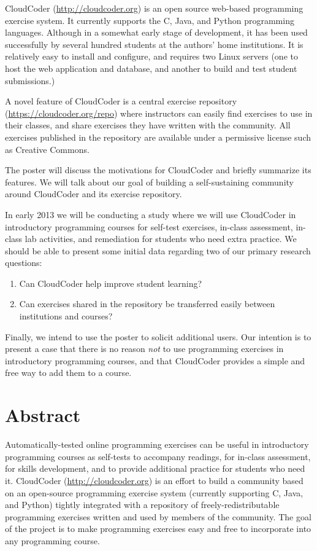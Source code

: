 \documentclass[11pt]{article}
\newcommand{\BE}{\begin{enumerate}[itemsep=.05in,parsep=0in]}
\newcommand{\EE}{\end{enumerate}}
\begin{document}
CloudCoder (\url{http://cloudcoder.org}) is an open source web-based
programming exercise system.  It currently supports the C, Java, and
Python programming languages.  Although in a somewhat early stage of
development, it has been used successfully by several hundred students
at the authors' home institutions.  It is relatively easy to
install and configure, and requires two Linux servers
(one to host the web application and database, and another to build
and test student submissions.)

A novel feature of CloudCoder is a central exercise repository
(\url{https://cloudcoder.org/repo}) where
instructors can easily find exercises to use in their classes,
and share exercises they have written with the community.  All exercises
published in the repository are available under a permissive license
such as Creative Commons.

The poster will discuss the motivations for CloudCoder and briefly summarize
its features.  We will talk about our goal of building a self-sustaining
community around CloudCoder and its exercise repository.

In early 2013 we will be conducting a study where we will use CloudCoder
in introductory programming courses for self-test exercises, in-class
assessment, in-class lab activities, and remediation for students who need
extra practice.  We should be able to present some initial data regarding
two of our primary research questions:

\BE
\item Can CloudCoder help improve student learning?
\item Can exercises shared in the repository be transferred
      easily between institutions and courses?
\EE

Finally, we intend to use the poster to solicit additional users.
Our intention is to present a case that there is no reason {\em not}
to use programming exercises in introductory programming courses,
and that CloudCoder provides a simple and free way to add them
to a course.

\section*{Abstract}

Automatically-tested online programming exercises can be useful in
introductory programming courses as self-tests to accompany readings,
for in-class assessment, for skills development, and to provide
additional practice for students who need it.  CloudCoder (\url{http://cloudcoder.org}) is
an effort to build a community based on an open-source programming exercise
system (currently supporting C, Java, and Python) tightly integrated
with a repository of freely-redistributable
programming exercises written and used by members of the community.
The goal of the project is to make programming exercises easy and free
to incorporate into any programming course.
\end{document}
